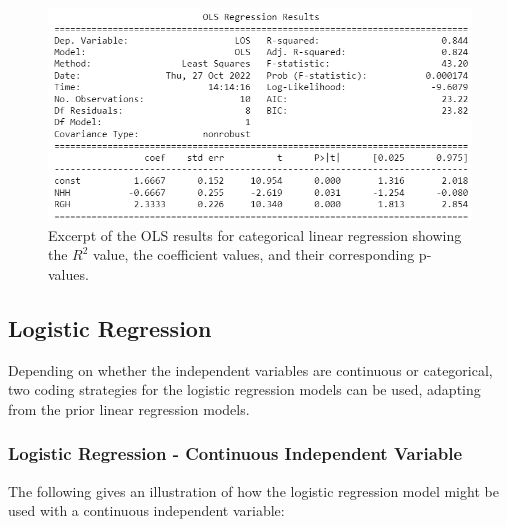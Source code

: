 \documentclass[../thesis.tex]{subfiles}
\begin{document}
\begin{figure}[h!]
    \centering
    \includegraphics{Chapters/Chapter3/Figures/OLS Results - Cat1.png}
    \caption{Excerpt of the OLS results for categorical linear regression showing the \(R^2\) value, the coefficient values, and their corresponding p-values.}
    \label{fig:OLSCatLinReg}
\end{figure}

\subsection{Logistic Regression}
Depending on whether the independent variables are continuous or categorical, two coding strategies for the logistic regression models can be used, adapting from the prior linear regression models.

\subsubsection{Logistic Regression - Continuous Independent Variable}
The following gives an illustration of how the logistic regression model might be used with a continuous independent variable:
\end{document}

